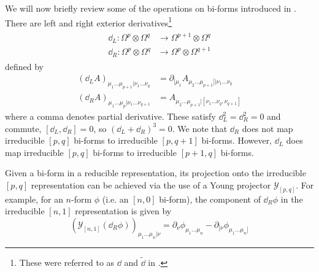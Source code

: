 We will now briefly review some of the operations on bi-forms
introduced in \cite{Medeiros2003ExoticDuality}. There are left and right exterior derivatives\footnote{These were referred to as $\dd$ and $\tilde{\dd}$ in \cite{Medeiros2003ExoticDuality}.}
\begin{align}
\begin{split}
    \dd_L : \Omega^p \otimes \Omega^q &\to \Omega^{p+1} \otimes \Omega^q \\
    \dd_R : \Omega^p \otimes \Omega^q &\to \Omega^p \otimes \Omega^{q+1}
\end{split}
\end{align}
defined by
\begin{equation}
\begin{split}
    (\dd_L A)_{\mu_1\dots\mu_{p+1}|\nu_1\dots\nu_q} &= \partial_{[\mu_1} A_{\mu_2\dots\mu_{p+1}]|\nu_1\dots\nu_q} \\
    (\dd_R A)_{\mu_1\dots\mu_p|\nu_1\dots\nu_{q+1}} &= A_{\mu_2\dots\mu_{p+1}|[\nu_1\dots\nu_q,\nu_{q+1}]}
\end{split}
\end{equation}
where a comma denotes partial derivative.
These satisfy $\dd_L^2 = \dd_R^2 = 0$ and commute, $[\dd_L,\dd_R]=0$, so $(\dd_L+\dd_R)^3=0$.
We note that $\dd_R$ does not map irreducible $[p,q]$ bi-forms to irreducible $[p,q+1]$ bi-forms. However, $\dd_L$ does map irreducible $[p,q]$ bi-forms to irreducible $[p+1,q]$ bi-forms.

Given a bi-form in a reducible representation, its projection onto the irreducible $[p,q]$ representation can be achieved via the use of a Young projector $\mathcal{Y}_{[p,q]}$. For example, for an $n$-form $\phi$ (i.e. an $[n,0]$ bi-form), the component of $\dd_R\phi$ in the irreducible $[n,1]$ representation is given by
\begin{equation}
    \left(\mathcal{Y}_{[n,1]} (\dd_R \phi)\right)_{\mu_1\dots\mu_n|\nu} = \partial_\nu \phi_{\mu_1\dots\mu_n} - \partial_{[\nu} \phi_{\mu_1\dots\mu_n]}
\end{equation}

